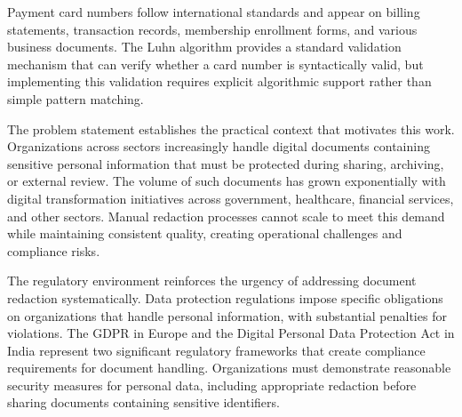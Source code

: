 Payment card numbers follow international standards and appear on billing statements, transaction records, membership enrollment forms, and various business documents. The Luhn algorithm provides a standard validation mechanism that can verify whether a card number is syntactically valid, but implementing this validation requires explicit algorithmic support rather than simple pattern matching.

\bigskip

The problem statement establishes the practical context that motivates this work. Organizations across sectors increasingly handle digital documents containing sensitive personal information that must be protected during sharing, archiving, or external review. The volume of such documents has grown exponentially with digital transformation initiatives across government, healthcare, financial services, and other sectors. Manual redaction processes cannot scale to meet this demand while maintaining consistent quality, creating operational challenges and compliance risks.

The regulatory environment reinforces the urgency of addressing document redaction systematically. Data protection regulations impose specific obligations on organizations that handle personal information, with substantial penalties for violations. The GDPR in Europe and the Digital Personal Data Protection Act in India represent two significant regulatory frameworks that create compliance requirements for document handling. Organizations must demonstrate reasonable security measures for personal data, including appropriate redaction before sharing documents containing sensitive identifiers.
